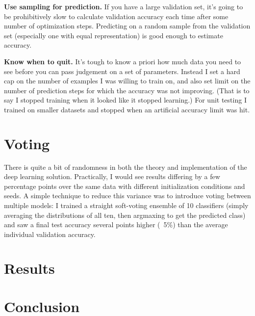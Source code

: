 \documentclass{article}
\begin{document}
\textbf{Use sampling for prediction.} If you have a large validation set, it's going to be prohibitively slow to calculate validation accuracy each time after some number of optimization steps. Predicting on a random sample from the validation set (especially one with equal representation) is good enough to estimate accuracy.

\textbf{Know when to quit.} It's tough to know a priori how much data you need to see before you can pass judgement on a set of parameters. Instead I set a hard cap on the number of examples I was willing to train on, and also set limit on the number of prediction steps for which the accuracy was not improving. (That is to say I stopped training when it looked like it stopped learning.) For unit testing I trained on smaller datasets and stopped when an artificial accuracy limit was hit.

\section{Voting}

There is quite a bit of randomness in both the theory and implementation of the deep learning solution.  Practically, I would see results differing by a few percentage points over the same data with different initialization conditions and seeds. A simple technique to reduce this variance was to introduce voting between multiple models: I trained a straight soft-voting ensemble of 10 classifiers (simply averaging the distributions of all ten, then argmaxing to get the predicted class) and saw a final test accuracy several points higher (~5\%) than the average individual validation accuracy.

\section{Results}

\section{Conclusion}

\printbibliography[heading=bibintoc,title={References}]
\end{document}
